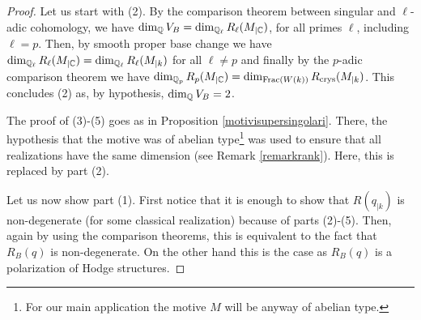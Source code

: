\documentclass[11pt]{amsart}
\begin{document}
\begin{proof}
Let us start with (2). By the comparison theorem between singular and $\ell$-adic cohomology, we have ${\dim_{\mathbb{Q}} V_B = \dim_{\mathbb{Q}_\ell}R_\ell(M_{\vert{\mathbb{C}}})}$, for all primes $\ell$, including $\ell=p$.  Then, by smooth proper base change we have   $\dim_{\mathbb{Q}_\ell}R_\ell(M_{\vert{\mathbb{C}}})=\dim_{\mathbb{Q}_\ell}R_\ell(M_{\vert{k}})$ for all $\ell\neq p$ and finally by the $p$-adic comparison theorem we have
 $\dim_{\mathbb{Q}_p}R_p(M_{\vert{\mathbb{C}}})=\dim_{\mathrm{Frac}(W(k))}R_{\textnormal{crys}}(M_{\vert{k}})$. This concludes (2) as, by hypothesis, $\dim_{\mathbb{Q}} V_B=2$. 
 
 The proof of (3)-(5) goes as in Proposition \ref{motivisupersingolari}. There, the hypothesis that the motive was of abelian type\footnote{For our main application the motive $M$ will be anyway of abelian type.} was used to ensure that all  realizations have the same dimension (see Remark \ref{remarkrank}). Here, this is replaced by part (2).
 
 Let us now show part (1). First notice that it is enough to show that $R(q_{\vert{k}})$ is non-degenerate (for some classical realization) because of parts (2)-(5).
 Then, again by using the comparison theorems, this is equivalent to the fact that $R_B(q)$ is non-degenerate. On the other hand this is the case as $R_B(q)$ is a polarization of Hodge structures.
\end{proof}
\end{document}
